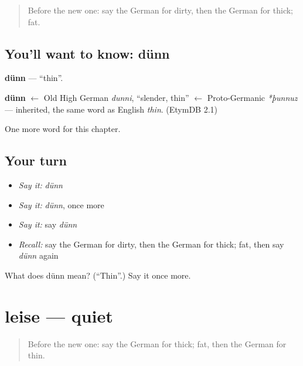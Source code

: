 \label{lesson:GE-C92-duenn}



\begin{quote}
Before the new one: say the German for dirty, then the German for thick; fat.
\end{quote}

\subsection*{You'll want to know: dünn}
\textbf{dünn} — \textquotedblleft{}thin\textquotedblright{}.

\begin{cousinweb}
\textbf{dünn} $\leftarrow$ Old High German \emph{dunni}, \textquotedblleft{}slender, thin\textquotedblright{} $\leftarrow$ Proto-Germanic \emph{*þunnuz} — inherited, the same word as English \emph{thin}. (EtymDB 2.1)
\end{cousinweb}

\begin{grammarlens}[title={What you've built}]
One more word for this chapter.
\end{grammarlens}

\subsection*{Your turn}
\begin{itemize}
\raggedright
  \item \emph{Say it:} \emph{dünn}
  \item \emph{Say it:} \emph{dünn}, once more
  \item \emph{Say it:} say \emph{dünn}
  \item \emph{Recall:} say the German for dirty, then the German for thick; fat, then say \emph{dünn} again
\end{itemize}

\begin{tcolorbox}[breakable,colback=teal!4,colframe=teal!35!black,title={Before you move on}]
What does dünn mean? (\textquotedblleft{}Thin\textquotedblright{}.) Say it once more.
\end{tcolorbox}
\section[leise]{leise — quiet}

\label{lesson:GE-C92-leise}



\begin{quote}
Before the new one: say the German for thick; fat, then the German for thin.
\end{quote}


